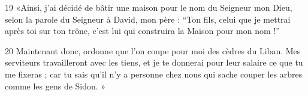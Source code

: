 
19 «Ainsi, j’ai décidé de bâtir une maison pour le nom du Seigneur mon Dieu, selon la parole du Seigneur à David, mon père : “Ton fils, celui que je mettrai après toi sur ton trône, c’est lui qui construira la Maison pour mon nom !”

20 Maintenant donc, ordonne que l’on coupe pour moi des cèdres du Liban. Mes serviteurs travailleront avec les tiens, et je te donnerai pour leur salaire ce que tu me fixeras ; car tu sais qu’il n’y a personne chez nous qui sache couper les arbres comme les gens de Sidon. »
